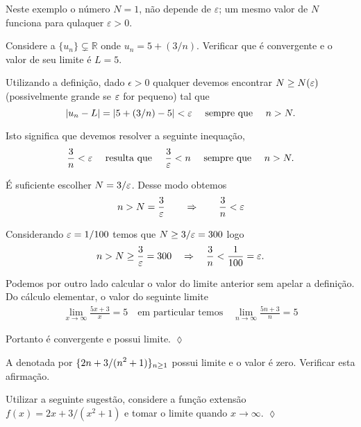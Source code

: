 Neste exemplo o n\'{u}mero $N=1$,  n\~{a}o depende de $\varepsilon$; um mesmo valor de $N$ funciona para qulaquer $\varepsilon>0$.

\begin{exer}
Considere a \seq $\{u_n\}\subsetneq \mathbb{R}$ onde $u_n=5+(3/n)$.
Verificar que \'{e} convergente e o valor de seu limite \'{e} $L=5$.
\end{exer}

\solo Utilizando a defini\c{c}\~{a}o, dado $\epsilon>0$ qualquer devemos
encontrar $N\geq N(\varepsilon)$ (possivelmente grande se $\varepsilon$ for pequeno)
tal que
\begin{equation}
|u_n-L|=|5+(3/n)-5|<\varepsilon\quad \text{ sempre que }\quad n>N.
\end{equation}

Isto significa que devemos resolver a seguinte inequa\c{c}\~{a}o,
\begin{align*}
  \frac{3}{n}<\varepsilon\quad \text{ resulta que }\quad  \frac{3}{\varepsilon}<n  \quad \text{ sempre que }\quad n>N.
\end{align*}

\'{E} suficiente escolher $N=3/\varepsilon$. Desse modo obtemos
\begin{equation*}
 n>N=\frac{3}{\varepsilon}\qquad\Rightarrow\qquad \frac{3}{n}<\varepsilon
\end{equation*}

Considerando $\varepsilon=1/100$ temos que $N\geq 3/\varepsilon=300$ logo
\begin{equation*}
  n>N\geq\frac{3}{\varepsilon}=300\quad\Rightarrow\quad \frac{3}{n}<\frac{1}{100}=\varepsilon.
\end{equation*}

Podemos por outro lado calcular o valor do limite anterior sem
apelar a defini\c{c}\~{a}o. Do c\'{a}lculo elementar, o valor do seguinte
limite
\begin{align*}
  \lim_{x\to\infty}\frac{5x+3}{x} =5 \quad \text{em particular temos}\quad
  \lim_{n\to\infty}\frac{5n+3}{n} =5
\end{align*}

Portanto \'{e} convergente e possui limite. \hfill \(\lozenge\)

\begin{exer}
A \seq denotada por $\displaystyle{\{2n+3/(n^2+1)\}_{n\geq 1}}$ possui
limite e o valor \'{e} zero. Verificar esta afirma\c{c}\~{a}o.
\end{exer}

\solo Utilizar a seguinte sugest\~{a}o, considere a fun\c{c}\~{a}o extens\~{a}o
$f(x)=2x+3/(x^2+1)$ e tomar o limite quando $x\to\infty$. \hfill
\(\lozenge\)

